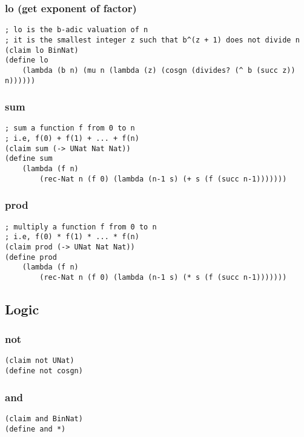 \subsubsection{lo (get exponent of factor)} \label{code:lo}
\begin{lstlisting}
; lo is the b-adic valuation of n
; it is the smallest integer z such that b^(z + 1) does not divide n
(claim lo BinNat)
(define lo
    (lambda (b n) (mu n (lambda (z) (cosgn (divides? (^ b (succ z)) n))))))
\end{lstlisting}

\subsubsection{sum} \label{code:sum}
\begin{lstlisting}
; sum a function f from 0 to n
; i.e, f(0) + f(1) + ... + f(n)
(claim sum (-> UNat Nat Nat))
(define sum
    (lambda (f n)
        (rec-Nat n (f 0) (lambda (n-1 s) (+ s (f (succ n-1)))))))
\end{lstlisting}

\subsubsection{prod} \label{code:prod}
\begin{lstlisting}
; multiply a function f from 0 to n
; i.e, f(0) * f(1) * ... * f(n)
(claim prod (-> UNat Nat Nat))
(define prod
    (lambda (f n)
        (rec-Nat n (f 0) (lambda (n-1 s) (* s (f (succ n-1)))))))
\end{lstlisting}


\subsection{Logic}

\subsubsection{not} \label{code:not}
\begin{lstlisting}
(claim not UNat)
(define not cosgn)
\end{lstlisting}

\subsubsection{and} \label{code:and}
\begin{lstlisting}
(claim and BinNat)
(define and *)
\end{lstlisting}

